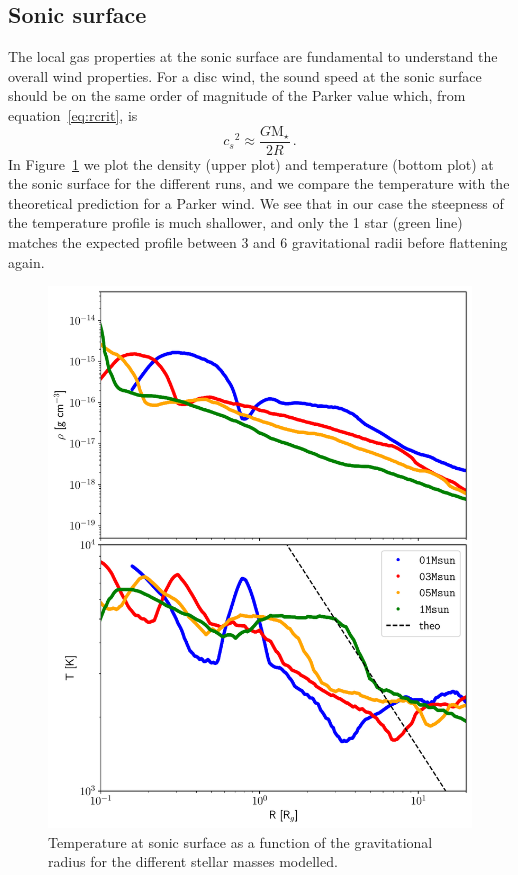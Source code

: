 \documentclass[usenatbib,useAMS,usedcolumn]{mnras}
\begin{document}
\subsection{Sonic surface}
The local gas properties at the sonic surface are fundamental to understand the overall wind properties.
For a disc wind, the sound speed at the sonic surface should be on the same order of magnitude of the Parker value which, from equation~\ref{eq:rcrit}, is
\begin{equation}
    {c_s}^2 \approx \frac{G \mathrm{M}_\star}{2R}\,.
\end{equation}
In Figure~\ref{fig:sonicsurf} we plot the density (upper plot) and temperature (bottom plot) at the sonic surface for the different runs, and we compare the temperature with the theoretical prediction for a Parker wind.
We see that in our case the steepness of the temperature profile is much shallower, and only the \SI{1}{\solarmass} star (green line) matches the expected profile between $3$ and $6$ gravitational radii before flattening again.
\begin{figure}
    \centering
    \includegraphics[width=\columnwidth]{Figure9}
    \caption{Temperature at sonic surface as a function of the gravitational radius for the different stellar masses modelled. \label{fig:sonicsurf}}
\end{figure}
\end{document}
